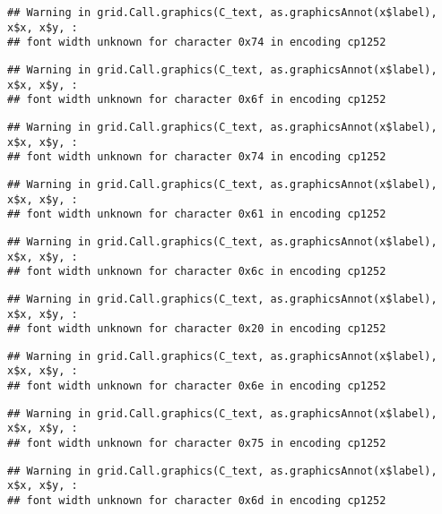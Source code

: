 \documentclass[
]{article}
\begin{document}
\begin{verbatim}
## Warning in grid.Call.graphics(C_text, as.graphicsAnnot(x$label), x$x, x$y, :
## font width unknown for character 0x74 in encoding cp1252
\end{verbatim}

\begin{verbatim}
## Warning in grid.Call.graphics(C_text, as.graphicsAnnot(x$label), x$x, x$y, :
## font width unknown for character 0x6f in encoding cp1252
\end{verbatim}

\begin{verbatim}
## Warning in grid.Call.graphics(C_text, as.graphicsAnnot(x$label), x$x, x$y, :
## font width unknown for character 0x74 in encoding cp1252
\end{verbatim}

\begin{verbatim}
## Warning in grid.Call.graphics(C_text, as.graphicsAnnot(x$label), x$x, x$y, :
## font width unknown for character 0x61 in encoding cp1252
\end{verbatim}

\begin{verbatim}
## Warning in grid.Call.graphics(C_text, as.graphicsAnnot(x$label), x$x, x$y, :
## font width unknown for character 0x6c in encoding cp1252
\end{verbatim}

\begin{verbatim}
## Warning in grid.Call.graphics(C_text, as.graphicsAnnot(x$label), x$x, x$y, :
## font width unknown for character 0x20 in encoding cp1252
\end{verbatim}

\begin{verbatim}
## Warning in grid.Call.graphics(C_text, as.graphicsAnnot(x$label), x$x, x$y, :
## font width unknown for character 0x6e in encoding cp1252
\end{verbatim}

\begin{verbatim}
## Warning in grid.Call.graphics(C_text, as.graphicsAnnot(x$label), x$x, x$y, :
## font width unknown for character 0x75 in encoding cp1252
\end{verbatim}

\begin{verbatim}
## Warning in grid.Call.graphics(C_text, as.graphicsAnnot(x$label), x$x, x$y, :
## font width unknown for character 0x6d in encoding cp1252
\end{verbatim}
\end{document}

